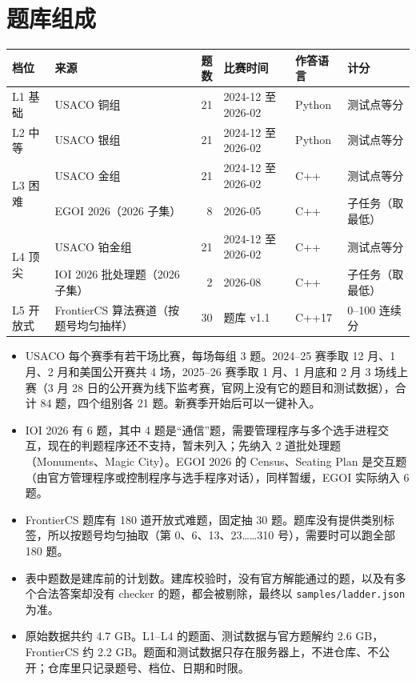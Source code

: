 \documentclass[11pt,a4paper,fontset=none]{ctexart}
\begin{document}
\section{题库组成}
\begin{center}
\small
\begin{tabularx}{\linewidth}{@{}l>{\raggedright}p{4.2cm}rlll@{}}
\toprule
档位 & 来源 & 题数 & 比赛时间 & 作答语言 & 计分 \\
\midrule
L1 基础 & USACO 铜组 & 21 & 2024-12 至 2026-02 & Python & 测试点等分 \\
L2 中等 & USACO 银组 & 21 & 2024-12 至 2026-02 & Python & 测试点等分 \\
\multirow{2}{*}{L3 困难} & USACO 金组 & 21 & 2024-12 至 2026-02 & C++ & 测试点等分 \\
 & EGOI 2026（2026 子集） & 8 & 2026-05 & C++ & 子任务（取最低） \\
\multirow{2}{*}{L4 顶尖} & USACO 铂金组 & 21 & 2024-12 至 2026-02 & C++ & 测试点等分 \\
 & IOI 2026 批处理题（2026 子集） & 2 & 2026-08 & C++ & 子任务（取最低） \\
L5 开放式 & FrontierCS 算法赛道（按题号均匀抽样） & 30 & 题库 v1.1 & C++17 & 0--100 连续分 \\
\bottomrule
\end{tabularx}
\end{center}
\begin{itemize}
  \item USACO 每个赛季有若干场比赛，每场每组 3 题。2024--25 赛季取 12 月、1 月、2 月和美国公开赛共 4 场，2025--26 赛季取 1 月、1 月底和 2 月 3 场线上赛（3 月 28 日的公开赛为线下监考赛，官网上没有它的题目和测试数据），合计 84 题，四个组别各 21 题。新赛季开始后可以一键补入。
  \item IOI 2026 有 6 题，其中 4 题是“通信”题，需要管理程序与多个选手进程交互，现在的判题程序还不支持，暂未列入；先纳入 2 道批处理题（Monuments、Magic City）。EGOI 2026 的 Census、Seating Plan 是交互题（由官方管理程序或控制程序与选手程序对话），同样暂缓，EGOI 实际纳入 6 题。
  \item FrontierCS 题库有 180 道开放式难题，固定抽 30 题。题库没有提供类别标签，所以按题号均匀抽取（第 0、6、13、23……310 号），需要时可以跑全部 180 题。
  \item 表中题数是建库前的计划数。建库校验时，没有官方解能通过的题，以及有多个合法答案却没有 checker 的题，都会被剔除，最终以 \texttt{samples/ladder.json} 为准。
  \item 原始数据共约 4.7 GB。L1--L4 的题面、测试数据与官方题解约 2.6 GB，FrontierCS 约 2.2 GB。题面和测试数据只存在服务器上，不进仓库、不公开；仓库里只记录题号、档位、日期和时限。
\end{itemize}
\end{document}
